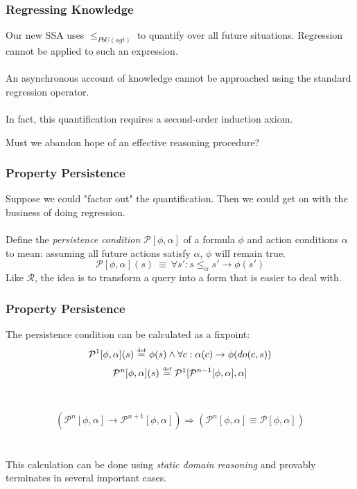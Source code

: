\documentclass{beamer}
\newcommand{\isdef}{\hbox{$\stackrel{\mbox{\tiny def}}{=}$}}
\newcommand{\Pst}{\mathcal{P}}
\begin{document}
\begin{frame}
\frametitle{Regressing Knowledge}
Our new SSA uses $\leq_{PbU(agt)}$  to quantify over all future situations.  Regression cannot be applied to such an expression.
\ \\
\ \\
An asynchronous account of knowledge \alert{cannot} be approached using
the standard regression operator.
\ \\
\ \\
\pause
In fact, this quantification requires a second-order induction axiom.

Must we abandon hope of an effective reasoning procedure?
\end{frame}

\begin{frame}
\frametitle{Property Persistence}
Suppose we could "factor out" the quantification. Then we could get
on with the business of doing regression.
\ \\
\ \\
Define the \emph{persistence condition} $\mathcal{P}[\phi,\alpha]$ of a formula
 $\phi$ and action conditions $\alpha$ to mean: assuming all future actions
satisfy $\alpha$, $\phi$ will remain true.
\begin{equation*}
  \mathcal{P}[\phi,\alpha](s)\ \equiv\ \forall s': s \leq_{\alpha} s' \rightarrow \phi(s')
\end{equation*}
Like $\mathcal{R}$, the idea is to transform a query into a form that is easier
to deal with.
\end{frame}

\begin{frame}
\frametitle{Property Persistence}
The persistence condition can be calculated as a fixpoint:
\begin{equation*}
  \Pst^{1}[\phi,\alpha](s)\ \isdef\ \phi(s) \wedge \forall c: \alpha(c) \rightarrow \phi(do(c,s))
\end{equation*}
\begin{equation*}
  \Pst^{n}[\phi,\alpha](s)\ \isdef\ \Pst^{1}[\Pst^{n-1}[\phi,\alpha],\alpha]
\end{equation*}
\ \\
\ \\
\pause
\begin{equation*}
  \left(\Pst^{n}[\phi,\alpha] \rightarrow \Pst^{n+1}[\phi,\alpha]\right) \Rightarrow \left(\Pst^{n}[\phi,\alpha] \equiv \Pst[\phi,\alpha]\right)
\end{equation*}
\ \\
\ \\
This calculation can be done using \emph{static domain reasoning} and provably terminates in several important cases.
\end{frame}
\end{document}

